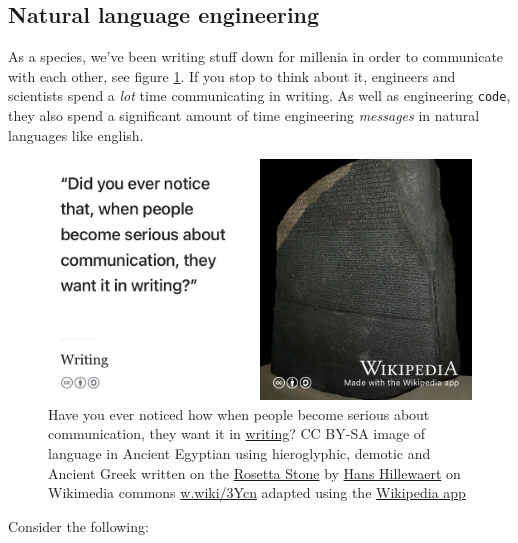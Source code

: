 \documentclass[
]{book}
\begin{document}
\hypertarget{nle}{%
\subsection{Natural language engineering}\label{nle}}

As a species, we've been writing stuff down for millenia in order to communicate with each other, see figure \ref{fig:rosetta-fig}. If you stop to think about it, engineers and scientists spend a \emph{lot} time communicating in writing. As well as engineering \texttt{code}, they also spend a significant amount of time engineering \emph{messages} in natural languages like english.

\begin{figure}

{\centering \includegraphics[width=1\linewidth]{images/rosetta-stone} 

}

\caption{Have you ever noticed how when people become serious about communication, they want it in \href{https://en.wikipedia.org/wiki/Writing}{writing}? CC BY-SA image of language in Ancient Egyptian using hieroglyphic, demotic and Ancient Greek written on the \href{https://en.wikipedia.org/wiki/Rosetta_Stone}{Rosetta Stone} by \href{https://commons.wikimedia.org/wiki/Category:Photographs_by_Hans_Hillewaert}{Hans Hillewaert} on Wikimedia commons \href{https://w.wiki/3Ycn}{w.wiki/3Ycn} adapted using the \href{https://apps.apple.com/us/app/wikipedia/id324715238}{Wikipedia app}}\label{fig:rosetta-fig}
\end{figure}



Consider the following:
\end{document}
